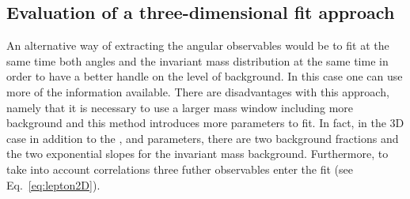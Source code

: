 %
%



\subsection{Evaluation of a three-dimensional fit approach}

An alternative way of extracting the angular observables would be to fit at the same time both angles 
and the invariant mass distribution at the same time in order to have a better handle on the level of background.
In this case one can use more of the information available. There are disadvantages with this approach, namely that
it is necessary to use a larger mass window including more background and this method introduces more parameters to fit.
In fact, in the 3D case in addition to the \afbl, \fl and \afbh parameters, there are
two background fractions and the two exponential slopes for the invariant mass background.
Furthermore, to take into account correlations three futher observables enter the fit (see Eq.~\ref{eq:lepton2D}). 

